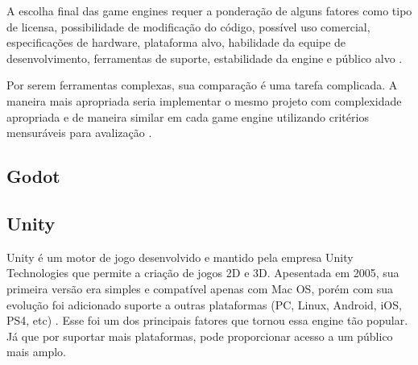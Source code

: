 \begin{figure}[h!]
	\centering
\end{figure}
\nocite{subsurface}

A escolha final das game engines requer a ponderação de alguns fatores como tipo de licensa, possibilidade de modificação do código, possível uso comercial, especificações de hardware, plataforma alvo, habilidade da equipe de desenvolvimento, ferramentas de suporte, estabilidade da engine e público alvo \cite{navarro2012}.

Por serem ferramentas complexas, sua comparação é uma tarefa complicada. A maneira mais apropriada seria implementar o mesmo projeto com complexidade apropriada e de maneira similar em cada game engine utilizando critérios mensuráveis para avalização \cite{vsmid2017comparison}.  

\subsection{Godot}
\label{sec:godot}



\subsection{Unity}
\label{sec:unity}

Unity é um motor de jogo desenvolvido e mantido pela empresa Unity Technologies que permite a criação de jogos 2D e 3D. Apesentada em 2005, sua primeira versão era simples e compatível apenas com Mac OS, porém com sua evolução foi adicionado suporte a outras plataformas (PC, Linux, Android, iOS, PS4, etc) \cite{compStudyGE}. Esse foi um dos principais fatores que tornou essa engine tão popular. Já que por suportar mais plataformas, pode proporcionar acesso a um público mais amplo.

